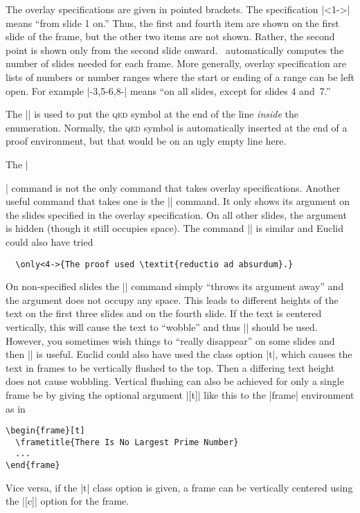 The overlay specifications are given in pointed brackets. The specification |<1->| means ``from slide 1 on.'' Thus, the first and fourth item are shown on the first slide of the frame, but the other two items are not shown. Rather, the second point is shown only from the second slide onward. \beamer\ automatically computes the number of slides needed for each frame. More generally, overlay specification are lists of numbers or number ranges where the start or ending of a range can be left open. For example |-3,5-6,8-| means ``on all slides, except for slides 4 and~7.''

The |\qedhere| is used to put the \textsc{qed} symbol at the end of the line \emph{inside} the enumeration. Normally, the \textsc{qed} symbol is automatically inserted at the end of a proof environment, but that would be on an ugly empty line here.

The |\item| command is not the only command that takes overlay specifications. Another useful command that takes one is the |\uncover| command. It only shows its argument on the slides specified in the overlay specification. On all other slides, the argument is hidden (though it still occupies space). The command |\only| is similar and Euclid could also have tried
\begin{verbatim}
  \only<4->{The proof used \textit{reductio ad absurdum}.}
\end{verbatim}

On non-specified slides the |\only| command simply ``throws its argument away'' and the argument does not occupy any space. This leads to different heights of the text on the first three slides and on the fourth slide. If the text is centered vertically, this will cause the text to ``wobble'' and thus |\uncover| should be used. However, you sometimes wish things to ``really disappear'' on some slides and then |\only| is useful. Euclid could also have used the class option |t|, which causes the text in frames to be vertically flushed to the top. Then a differing text height does not cause wobbling. Vertical flushing can also be achieved for only a single frame be by giving the optional argument |[t]| like this to the |frame| environment as in
\begin{verbatim}
\begin{frame}[t]
  \frametitle{There Is No Largest Prime Number}
  ...
\end{frame}
\end{verbatim}
Vice versa, if the |t| class option is given, a frame can be vertically centered using the |[c]| option for the frame.

